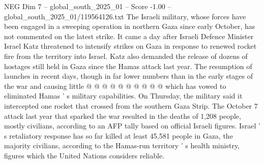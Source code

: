 \begin{textsample}{NEG Dim 7 – global\_south\_2025\_01 – Score -1.00 – global\_south\_2025\_01/119564126.txt}
The Israeli military, whose forces have been engaged in a sweeping operation in northern Gaza since early October, has not commented on the latest strike.
It came a day after Israeli Defence Minister Israel Katz threatened to intensify strikes on Gaza in response to renewed rocket fire from the territory into Israel.
Katz also demanded the release of dozens of hostages still held in Gaza since the Hamas attack last year.
The resumption of launches in recent days, though in far lower numbers than in the early stages of the war and causing little @ @ @ @ @ @ @ @ @ @ which has vowed to eliminated Hamas ' s military capabilities.
On Thursday, the military said it intercepted one rocket that crossed from the southern Gaza Strip.
The October 7 attack last year that sparked the war resulted in the deaths of 1,208 people, mostly civilians, according to an AFP tally based on official Israeli figures.
Israel ' s retaliatory response has so far killed at least 45,581 people in Gaza, the majority civilians, according to the Hamas-run territory ' s health ministry, figures which the United Nations considers reliable.

\end{textsample}
